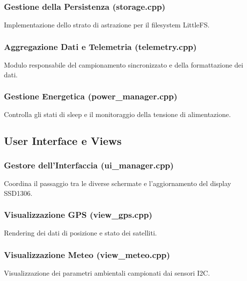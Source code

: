 \subsubsection{Gestione della Persistenza (storage.cpp)}
Implementazione dello strato di astrazione per il filesystem LittleFS.


\subsubsection{Aggregazione Dati e Telemetria (telemetry.cpp)}
Modulo responsabile del campionamento sincronizzato e della formattazione dei dati.


\subsubsection{Gestione Energetica (power\_manager.cpp)}
Controlla gli stati di sleep e il monitoraggio della tensione di alimentazione.


\subsection{User Interface e Views}

\subsubsection{Gestore dell'Interfaccia (ui\_manager.cpp)}
Coordina il passaggio tra le diverse schermate e l'aggiornamento del display SSD1306.


\subsubsection{Visualizzazione GPS (view\_gps.cpp)}
Rendering dei dati di posizione e stato dei satelliti.


\subsubsection{Visualizzazione Meteo (view\_meteo.cpp)}
Visualizzazione dei parametri ambientali campionati dai sensori I2C.

